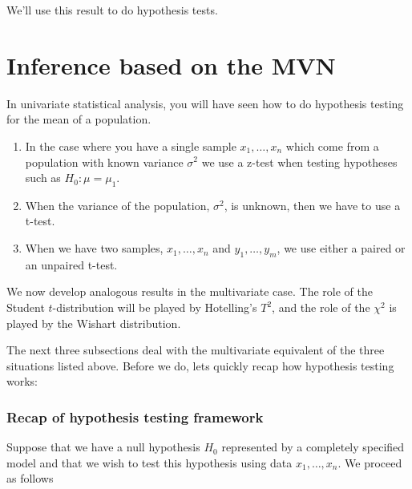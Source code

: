 \documentclass[]{book}
\theoremstyle{definition}
\theoremstyle{definition}
\theoremstyle{definition}
\theoremstyle{remark}
\begin{document}
We'll use this result to do hypothesis tests.

\hypertarget{inference-based-on-the-mvn}{%
\section{Inference based on the MVN}\label{inference-based-on-the-mvn}}

In univariate statistical analysis, you will have seen how to do hypothesis testing for the mean of a population.

\begin{enumerate}
\def\labelenumi{\arabic{enumi}.}
\item
  In the case where you have a single sample \(x_1, \ldots, x_n\) which come from a population with known variance \(\sigma^2\) we use a z-test when testing hypotheses such as
  \(H_0: \mu=\mu_1\).
\item
  When the variance of the population, \(\sigma^2\), is unknown, then we have to use a t-test.
\item
  When we have two samples, \(x_1, \ldots, x_n\) and \(y_1, \ldots, y_m\), we use either a paired or an unpaired t-test.
\end{enumerate}

We now develop analogous results in the multivariate case. The role of the Student \(t\)-distribution will be played by Hotelling's \(T^2\), and the role of the \(\chi^2\) is played by the Wishart distribution.

The next three subsections deal with the multivariate equivalent of the three situations listed above. Before we do, lets quickly recap how hypothesis testing works:

\hypertarget{recap-of-hypothesis-testing-framework}{%
\subsubsection*{Recap of hypothesis testing framework}\label{recap-of-hypothesis-testing-framework}}

Suppose that we have a null hypothesis \(H_0\) represented by a completely specified model and that we wish to test this hypothesis using data \(x_1, \ldots, x_n\). We proceed as follows
\end{document}
